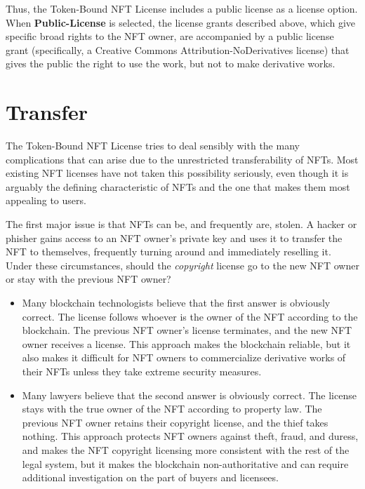\documentclass{article}
\newcommand{\iccclicense}{Token-Bound NFT License\xspace}
\newcommand{\keyword}[1]{\textbf{#1}\xspace}
\newcommand{\publiclicense}{\keyword{Public-License}}
\begin{document}
Thus, the \iccclicense includes a public license as a license option. When \publiclicense is selected, the license grants described above, which give specific broad rights to the NFT owner, are accompanied by a public license grant (specifically, a Creative Commons Attribution-NoDerivatives license) that gives the public the right to use the work, but not to make derivative works.



\section{Transfer}
\label{sec:trans}

The \iccclicense tries to deal sensibly with the many complications that can arise due to the unrestricted transferability of NFTs. Most existing NFT licenses have not taken this possibility seriously, even though it is arguably the defining characteristic of NFTs and the one that makes them most appealing to users.

The first major issue is that NFTs can be, and frequently are, stolen. A hacker or phisher gains access to an NFT owner's private key and uses it to transfer the NFT to themselves, frequently turning around and immediately reselling it. Under these circumstances, should the \emph{copyright} license go to the new NFT owner or stay with the previous NFT owner?
\begin{itemize}
\item Many blockchain technologists believe that the first answer is obviously correct. The license follows whoever is the owner of the NFT according to the blockchain. The previous NFT owner's license terminates, and the new NFT owner receives a license. This approach makes the blockchain reliable, but it also makes it difficult for NFT owners to commercialize derivative works of their NFTs unless they take extreme security measures.
\item Many lawyers believe that the second answer is obviously correct. The license stays with the true owner of the NFT according to property law. The previous NFT owner retains their copyright license, and the thief takes nothing. This approach protects NFT owners against theft, fraud, and duress, and makes the NFT copyright licensing more consistent with the rest of the legal system, but it makes the blockchain non-authoritative and can require additional investigation on the part of buyers and licensees.
\end{itemize}
\end{document}
